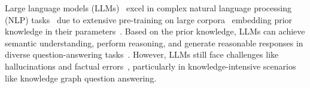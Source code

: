 \documentclass[11pt]{article}
\begin{document}


Large language models (LLMs)~\cite{openai2024gpt4technicalreport,brown2020languagemodelsfewshotlearners,chowdhery2022palmscalinglanguagemodeling,azaria2024chat} excel in complex natural language processing (NLP) tasks~\cite{wei2023chainofthoughtpromptingelicitsreasoning,khot2023decomposedpromptingmodularapproach,li2023evaluation} due to extensive pre-training on large corpora~\cite{rawte2023surveyhallucinationlargefoundation} embedding prior knowledge in their parameters~\cite{khot2023decomposedpromptingmodularapproach}.
Based on the prior knowledge, LLMs can achieve semantic understanding, perform reasoning, and generate reasonable responses in diverse question-answering tasks~\cite{li2023unigenunifiedgenerativeframework,zhao2024generating}. However, LLMs still face challenges like hallucinations and factual errors~\cite{Ji_2023,chen2024large}, particularly in knowledge-intensive scenarios like knowledge graph question answering. 
\end{document}
